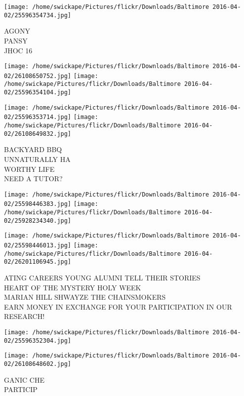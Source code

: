 \documentclass[10pt,letterpaper]{article}
\begin{document}
\vspace{0.25in}
\texttt{[image: /home/swickape/Pictures/flickr/Downloads/Baltimore 2016-04-02/25596354734.jpg]}

AGONY\\
PANSY\\
JHOC 16\\
\pagebreak

\texttt{[image: /home/swickape/Pictures/flickr/Downloads/Baltimore 2016-04-02/26108650752.jpg]}
\texttt{[image: /home/swickape/Pictures/flickr/Downloads/Baltimore 2016-04-02/25596354104.jpg]}

\texttt{[image: /home/swickape/Pictures/flickr/Downloads/Baltimore 2016-04-02/25596353714.jpg]}
\texttt{[image: /home/swickape/Pictures/flickr/Downloads/Baltimore 2016-04-02/26108649832.jpg]}

BACKYARD BBQ\\
UNNATURALLY HA\\
WORTHY LIFE\\
NEED A TUTOR?\\
\pagebreak

\texttt{[image: /home/swickape/Pictures/flickr/Downloads/Baltimore 2016-04-02/25598446383.jpg]}
\texttt{[image: /home/swickape/Pictures/flickr/Downloads/Baltimore 2016-04-02/25928234340.jpg]}

\texttt{[image: /home/swickape/Pictures/flickr/Downloads/Baltimore 2016-04-02/25598446013.jpg]}
\texttt{[image: /home/swickape/Pictures/flickr/Downloads/Baltimore 2016-04-02/26201106945.jpg]}

ATING CAREERS YOUNG ALUMNI TELL THEIR STORIES\\
HEART OF THE MYSTERY HOLY WEEK\\
MARIAN HILL SHWAYZE THE CHAINSMOKERS\\
EARN MONEY IN EXCHANGE FOR YOUR PARTICIPATION IN OUR RESEARCH!\\
\pagebreak

\texttt{[image: /home/swickape/Pictures/flickr/Downloads/Baltimore 2016-04-02/25596352304.jpg]}

\vspace{0.25in}
\texttt{[image: /home/swickape/Pictures/flickr/Downloads/Baltimore 2016-04-02/26108648602.jpg]}

GANIC CHE\\
PARTICIP\\
\pagebreak
\end{document}
